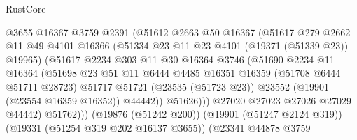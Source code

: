 \begin{lexlean}{RustCore}
\begin{coremodule}
                                  @3655
                                  @16367
                                  @3759
                                  @2391
                                  (@51612
                                    @2663
                                    @50
                                    @16367
                                    (@51617
                                      @279
                                      @2662
                                      @11
                                      @49
                                      @4101
                                      @16366
                                      (@51334 @23 @11 @23 @4101 (@19371 (@51339 @23)) @19965)
                                      (@51617
                                        @2234
                                        @303
                                        @11
                                        @30
                                        @16364
                                        @3746
                                        (@51690
                                          @2234
                                          @11
                                          @16364
                                          (@51698
                                            @23
                                            @51
                                            @11
                                            @6444
                                            @4485
                                            @16351
                                            @16359
                                            (@51708 @6444 @51711 @28723)
                                            @51717
                                            @51721
                                            (@23535 (@51723 @23))
                                            @23552
                                            (@19901 (@23554 @16359 @16352))
                                            @44442))
                                        @51626)))
                                  @27020
                                  @27023
                                  @27026
                                  @27029
                                  @44442)
                                @51762)))
                          (@19876 (@51242 @200))
                          (@19901 (@51247 @2124 @319))
                          (@19331 (@51254 @319 @202 @16137 @3655))
                          (@23341
                            @44878
                            @3759

\end{coremodule}
\end{lexlean}
